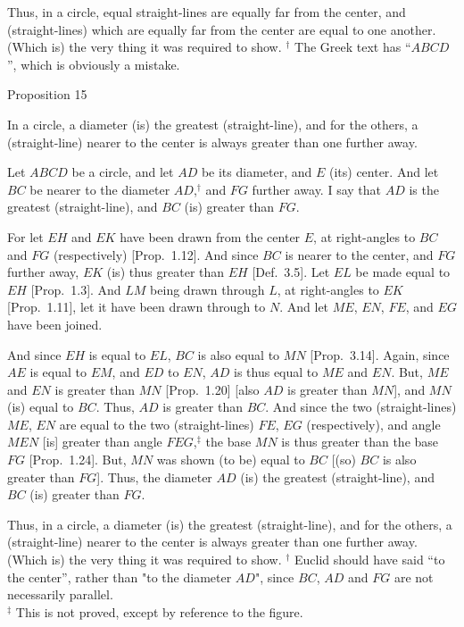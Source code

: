 Thus, in a circle, equal straight-lines are equally far from the center, and
(straight-lines) which are equally far from the center are equal to one another.
(Which is) the very thing it was required to show.
{\footnotesize \noindent$^\dag$ The Greek text has ``$ABCD$'', which is obviously a
mistake.}


\begin{center}
{\large Proposition 15}
\end{center}

In a circle, a diameter (is) the greatest (straight-line), and for 
the others, a (straight-line) nearer to the center is always greater than one further away.

Let $ABCD$ be a circle, and let $AD$ be its diameter, and $E$ (its) center.
And let $BC$ be nearer to the diameter $AD$,$^\dag$ and $FG$ further away. I say that
$AD$ is the greatest (straight-line), and $BC$ (is) greater than $FG$.

For let $EH$ and $EK$ have been drawn from the center $E$, at right-angles
to $BC$ and $FG$ (respectively) [Prop.~1.12]. And since $BC$ is nearer to the center, and $FG$ further away, $EK$ (is) thus greater than $EH$ [Def.~3.5]. Let $EL$ be made equal to
$EH$ [Prop.~1.3]. And $LM$ being drawn through $L$, at right-angles to $EK$ [Prop.~1.11], 
let it have been drawn through to $N$. And let $ME$, $EN$, $FE$, and $EG$
have been joined.

And since $EH$ is equal to $EL$, $BC$ is also equal to $MN$ [Prop.~3.14]. Again,
since $AE$ is equal to $EM$, and $ED$ to $EN$, $AD$ is thus equal to $ME$ and $EN$.
But, $ME$ and $EN$ is greater than $MN$ [Prop.~1.20] [also $AD$ is greater than $MN$], and $MN$ (is) equal to $BC$. Thus, $AD$ is greater than $BC$. And since
the two (straight-lines) $ME$, $EN$ are equal to the two (straight-lines) $FE$, $EG$ (respectively),
and angle $MEN$ [is] greater than angle $FEG$,$^\ddag$ the base $MN$ is thus
greater than the base $FG$ [Prop.~1.24]. But, $MN$ was shown (to be) equal to $BC$ [(so) $BC$ is also greater than $FG$]. Thus, the diameter $AD$ (is) the
greatest (straight-line), and $BC$ (is) greater than $FG$.

\epsfysize=2.2in
\centerline{}

Thus, in a circle, a diameter (is) the greatest (straight-line), and for 
the others, a (straight-line) nearer to the center is always greater than one further away. (Which is) the very thing it was required to show.
{\footnotesize \noindent$^\dag$ Euclid should have said ``to the center'', rather than "to the diameter $AD$", since $BC$, $AD$ and $FG$ are not necessarily parallel.\\
$^\ddag$  This is not proved,
except by reference to the figure.}

